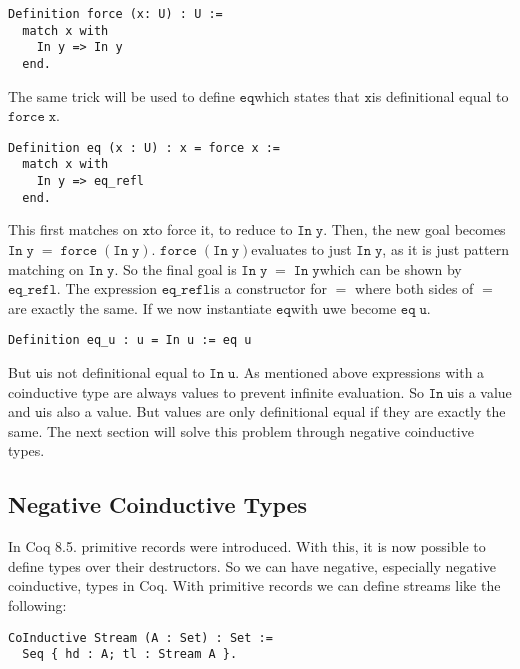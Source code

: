 \documentclass[a4paper,cleardoubleempty,BCOR1cm]{scrbook}
\begin{document}
\begin{verbatim}
Definition force (x: U) : U :=
  match x with
    In y => In y
  end.
\end{verbatim}

The same trick will be used to define $\mathtt{eq}$\;which states that $\mathtt{x}$\;is
definitional equal to $\mathtt{force\;x}$.

\begin{verbatim}
Definition eq (x : U) : x = force x :=
  match x with
    In y => eq_refl
  end.
\end{verbatim}

This first matches on $\mathtt{x}$\;to force it, to reduce to $\mathtt{In\;y}$. Then, the new goal
becomes $\mathtt{In\;y\;=\;force\;(In\;y)}$. $\mathtt{force\;(In\;y)}$\;evaluates to just $\mathtt{In\;y}$, as it
is just pattern matching on $\mathtt{In\;y}$. So the final goal is $\mathtt{In\;y\;=\;In\;y}$\;which
can be shown by $\mathtt{eq\_refl}$. The expression $\mathtt{eq\_refl}$\;is a constructor for $\mathtt{=}$
where both sides of $\mathtt{=}$\;are exactly the same. If we now instantiate $\mathtt{eq}$\;with
$\mathtt{u}$\;we become $\mathtt{eq\;u}$.

\begin{verbatim}
Definition eq_u : u = In u := eq u
\end{verbatim}

But $\mathtt{u}$\;is not definitional equal to $\mathtt{In\;u}$.  As mentioned above expressions
with a coinductive type are always values to prevent infinite evaluation.
So $\mathtt{In\;u}$\;is a value and $\mathtt{u}$\;is also a value.  But values are only
definitional equal if they are exactly the same.  The next section will
solve this problem through negative coinductive types.

\subsection{Negative Coinductive Types}
\label{sec:orgf9d728b}
In Coq 8.5. primitive records were introduced. With this, it is now possible
to define types over their destructors. So we can have negative, especially
negative coinductive, types in Coq. With primitive records we can define
streams like the following:

\begin{verbatim}
CoInductive Stream (A : Set) : Set :=
  Seq { hd : A; tl : Stream A }.
\end{verbatim}
\end{document}
